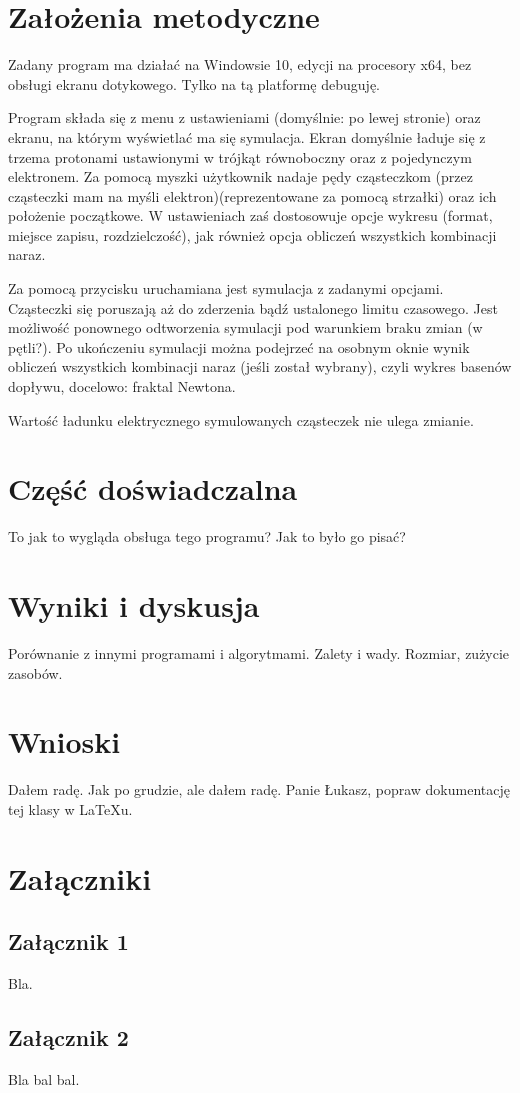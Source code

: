 \documentclass{SGGW-thesis}
\begin{document}
\chapter{Założenia metodyczne}
Zadany program ma działać na Windowsie 10, edycji na procesory x64, bez obsługi ekranu dotykowego. Tylko na tą platformę debuguję.

Program składa się z menu z ustawieniami (domyślnie: po lewej stronie) oraz ekranu, na którym wyświetlać ma się symulacja. Ekran domyślnie ładuje się z trzema protonami ustawionymi w trójkąt równoboczny oraz z pojedynczym elektronem. Za pomocą myszki użytkownik nadaje pędy cząsteczkom (przez cząsteczki mam na myśli elektron)(reprezentowane za pomocą strzałki) oraz ich położenie początkowe. W ustawieniach zaś dostosowuje opcje wykresu (format, miejsce zapisu, rozdzielczość), jak również opcja obliczeń wszystkich kombinacji naraz. 

Za pomocą przycisku uruchamiana jest symulacja z zadanymi opcjami. Cząsteczki się poruszają aż do zderzenia bądź ustalonego limitu czasowego. Jest możliwość ponownego odtworzenia symulacji pod warunkiem braku zmian (w pętli?). Po ukończeniu symulacji można podejrzeć na osobnym oknie wynik obliczeń wszystkich kombinacji naraz (jeśli został wybrany), czyli wykres basenów dopływu, docelowo: fraktal Newtona.

Wartość ładunku elektrycznego symulowanych cząsteczek nie ulega zmianie.

\chapter{Część doświadczalna}
To jak to wygląda obsługa tego programu? Jak to było go pisać?

\chapter{Wyniki i dyskusja}
Porównanie z innymi programami i algorytmami. Zalety i wady. Rozmiar, zużycie zasobów.

\chapter{Wnioski}
Dałem radę. Jak po grudzie, ale dałem radę.
Panie Łukasz, popraw dokumentację tej klasy w LaTeXu.

\chapter{Załączniki}
\section{Załącznik 1}
Bla.

\section{Załącznik 2}
Bla bal bal.



\beforelastpage[2025]
\end{document}
